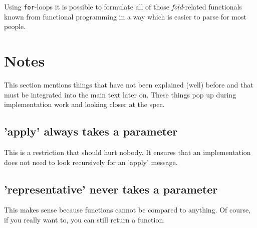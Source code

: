 \documentclass[11pt]{amsart}
\newcommand{\babelsrc}[1] {\lstinline!#1!}
\begin{document}
Using \babelsrc{for}-loops it is possible to formulate all of those \emph{fold}-related functionals known from functional programming in a way which is easier to parse for most people. 

\section{Notes}
This section mentions things that have not been explained (well) before and that must be integrated into the main text later on. These things pop up during implementation work and looking closer at the spec.

\subsection{'apply' always takes a parameter}
This is a restriction that should hurt nobody. It ensures that an implementation does not need to look recursively for an 'apply' message.

\subsection{'representative' never takes a parameter}
This makes sense because functions cannot be compared to anything. Of course, if you really want to, you can still return a function.
\end{document}
